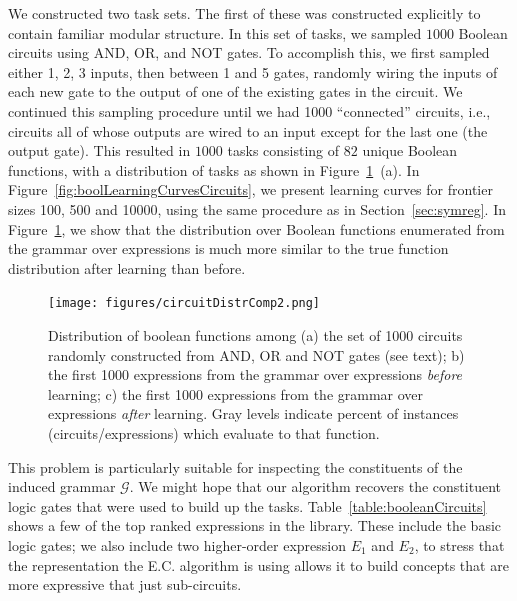 \documentclass{article}
\begin{document}
We constructed two task sets. The first of these was constructed
explicitly to contain familiar modular structure. In this set of
tasks, we sampled $1000$ Boolean circuits using AND, OR, and NOT
gates. To accomplish this, we first sampled either 1, 2, 3 inputs,
then between 1 and 5 gates, randomly wiring the inputs of each new
gate to the output of one of the existing gates in the circuit. We
continued this sampling procedure until we had 1000 ``connected''
circuits, i.e., circuits all of whose outputs are wired to an input
except for the last one (the output gate). This resulted in $1000$
tasks consisting of $82$ unique Boolean functions, with a distribution
of tasks as shown in Figure~\ref{fig:booldistr}~(a). In
Figure~\ref{fig:boolLearningCurvesCircuits}, we present learning
curves for frontier sizes 100, 500 and 10000, using the same procedure
as in Section~\ref{sec:symreg}. In Figure~\ref{fig:booldistr}, we show
that the distribution over Boolean functions enumerated from the
grammar over expressions is much more similar to the true function
distribution after learning than before.

\begin{figure}
\texttt{[image: figures/circuitDistrComp2.png]}
\caption{Distribution of boolean functions among (a) the set of 1000
  circuits randomly constructed from AND, OR and NOT gates (see text);
  b) the first 1000 expressions from the grammar over expressions
  \emph{before} learning; c) the first 1000 expressions from the
  grammar over expressions \emph{after} learning. Gray levels indicate
  percent of instances (circuits/expressions) which evaluate to that
  function.\label{fig:booldistr}}
\end{figure}

This problem is particularly suitable for inspecting the constituents
of the induced grammar $\mathcal{G}$. We might hope that our algorithm
recovers the constituent logic gates that were used to build up the
tasks. Table~\ref{table:booleanCircuits} shows a few of the top ranked
expressions in the library. These include the basic logic gates; we
also include two higher-order expression $E_1$ and $E_2$, to stress
that the representation the E.C. algorithm is using allows it to build
concepts that are more expressive that just sub-circuits.
\end{document}

